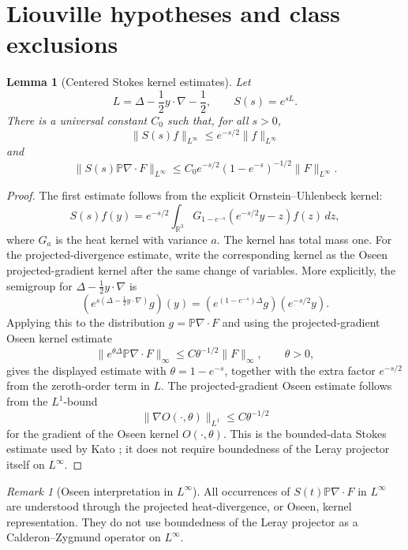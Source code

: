 \documentclass[11pt]{amsart}
\theoremstyle{plain}
\newtheorem{lemma}[lemma]{Lemma}
\theoremstyle{definition}
\theoremstyle{remark}
\newtheorem{remark}[remark]{Remark}
\numberwithin{equation}{section}
\newcommand{\R}{\mathbb R}
\begin{document}
\section{Liouville hypotheses and class exclusions}\label{p1:sec:liouville}

\begin{lemma}[Centered Stokes kernel estimates]
\label{p1:lem:centered-stokes-estimates}
Let
\[
   L=\Delta-\frac12y\cdot\nabla-\frac12,
   \qquad S(s)=e^{sL}.
\]
There is a universal constant \(C_0\) such that, for all \(s>0\),
\[
   \|S(s)f\|_{L^\infty}\le e^{-s/2}\|f\|_{L^\infty}
\]
and
\[
   \|S(s)\mathbb P\nabla\cdot F\|_{L^\infty}
   \le C_0 e^{-s/2}(1-e^{-s})^{-1/2}\|F\|_{L^\infty}.
\]
\end{lemma}

\begin{proof}
The first estimate follows from the explicit Ornstein--Uhlenbeck kernel:
\[
   S(s)f(y)=e^{-s/2}
   \int_{\R^3}G_{1-e^{-s}}(e^{-s/2}y-z)f(z)\,dz,
\]
where \(G_a\) is the heat kernel with variance \(a\).  The kernel has total
mass one.  For the projected-divergence estimate, write the corresponding
kernel as the Oseen projected-gradient kernel after the same change of
variables.  More explicitly, the semigroup for
\(\Delta-\frac12y\cdot\nabla\) is
\[
   (e^{s(\Delta-\frac12y\cdot\nabla)}g)(y)
   =
   (e^{(1-e^{-s})\Delta}g)(e^{-s/2}y).
\]
Applying this to the distribution \(g=\mathbb P\nabla\cdot F\) and using the
projected-gradient Oseen kernel estimate
\[
   \|e^{\theta\Delta}\mathbb P\nabla\cdot F\|_\infty
   \le C\theta^{-1/2}\|F\|_\infty,\qquad \theta>0,
\]
gives the displayed estimate with \(\theta=1-e^{-s}\), together with the
extra factor \(e^{-s/2}\) from the zeroth-order term in \(L\).  The
projected-gradient Oseen estimate follows from the \(L^1\)-bound
\[
   \|\nabla O(\cdot,\theta)\|_{L^1}\le C\theta^{-1/2}
\]
for the gradient of the Oseen kernel \(O(\cdot,\theta)\).  This is the
bounded-data Stokes estimate used by Kato \cite{Kato1984}; it does not require
boundedness of the Leray projector itself on \(L^\infty\).
\end{proof}

\begin{remark}[Oseen interpretation in \(L^\infty\)]
\label{p1:rem:oseen-Linfty}
All occurrences of \(S(t)\mathbb P\nabla\cdot F\) in \(L^\infty\) are
understood through the projected heat-divergence, or Oseen, kernel
representation.  They do not use boundedness of the Leray projector as a
Calderon--Zygmund operator on \(L^\infty\).
\end{remark}
\end{document}
